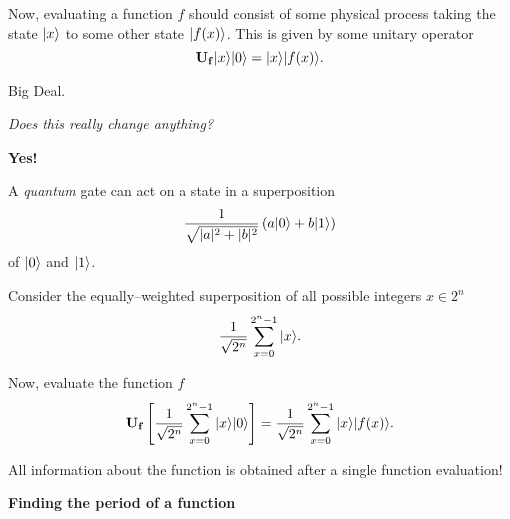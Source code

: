 \documentclass{slides}
\begin{document}
Now, evaluating a function $f$ should consist of some physical
process taking the state ${|{x}\rangle}$ to some
other state ${|{f(x)}\rangle}$.  This is given by some unitary
operator
\begin{equation*}
{\bf U_f}{|{x}\rangle}{|{0}\rangle} = {|{x}\rangle}{|{f(x)}\rangle}.
\end{equation*}

\begin{center}
Big Deal.  

{\sl Does this really change anything?}
\end{center}

\pagebreak

\begin{center}
{\bf Yes!}
\end{center}

%

A \emph{quantum} gate can act on a state in a superposition
\begin{equation*}
\frac{1}{\sqrt{|a|^2+|b|^2}}\left(a{|{0}\rangle}+b{|{1}\rangle}\right)
\end{equation*}
of ${|{0}\rangle}$
and ${|{1}\rangle}$.

Consider the equally--weighted superposition of all possible 
integers $x\in 2^n$
\begin{equation*}
\frac{1}{\sqrt{2^n}}\sum_{x=0}^{2^n-1} {|{x}\rangle}.
\end{equation*}

Now, evaluate the function $f$
\begin{equation*}
{\bf U_f} \left\lbrack
\frac{1}{\sqrt{2^n}}\sum_{x=0}^{2^n-1}{|{x}\rangle}{|{0}\rangle}
\right\rbrack
= 
\frac{1}{\sqrt{2^n}}\sum_{x=0}^{2^n-1}{|{x}\rangle}{|{f(x)}\rangle}.
\end{equation*}

All information about the function is obtained after a single
function evaluation!

\pagebreak

\begin{center}
\textbf{Finding the period of a function}
\end{center}
\end{document}
